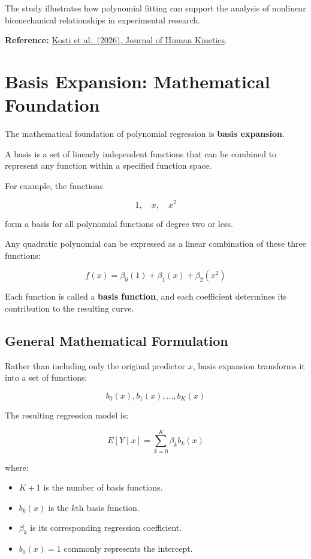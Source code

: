 \documentclass[
  letterpaper,
  DIV=11,
  numbers=noendperiod]{scrreprt}
\providecommand{\tightlist}{%
  \setlength{\itemsep}{0pt}\setlength{\parskip}{0pt}}
\begin{document}
The study illustrates how polynomial fitting can support the analysis of
nonlinear biomechanical relationships in experimental research.

\textbf{Reference:} \href{https://doi.org/10.5114/jhk/210346}{Kosti et
al.~(2026), Journal of Human Kinetics}.

\section{Basis Expansion: Mathematical
Foundation}\label{basis-expansion-mathematical-foundation}

The mathematical foundation of polynomial regression is \textbf{basis
expansion}.

A basis is a set of linearly independent functions that can be combined
to represent any function within a specified function space.

For example, the functions

\[
1,\quad x,\quad x^2
\]

form a basis for all polynomial functions of degree two or less.

Any quadratic polynomial can be expressed as a linear combination of
these three functions:

\[
f(x) = \beta_0(1) + \beta_1(x) + \beta_2(x^2)
\]

Each function is called a \textbf{basis function}, and each coefficient
determines its contribution to the resulting curve.

\subsection{General Mathematical
Formulation}\label{general-mathematical-formulation}

Rather than including only the original predictor \(x\), basis expansion
transforms it into a set of functions:

\[
b_0(x), b_1(x), \ldots, b_K(x)
\]

The resulting regression model is:

\[
\boxed{
E[Y \mid x] = \sum_{k=0}^{K} \beta_k b_k(x)
}
\]

where:

\begin{itemize}
\tightlist
\item
  \(K+1\) is the number of basis functions.
\item
  \(b_k(x)\) is the \(k\)th basis function.
\item
  \(\beta_k\) is its corresponding regression coefficient.
\item
  \(b_0(x)=1\) commonly represents the intercept.
\end{itemize}
\end{document}
